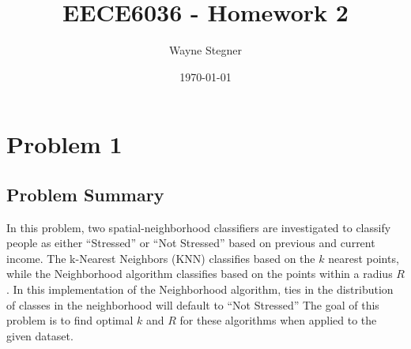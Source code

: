 \documentclass[a4paper, 11pt, titlepage]{article}
\title{EECE6036 - Homework 2}
\author{Wayne Stegner}
\date{\today}
\begin{document}
  \maketitle
  \section{Problem 1}
  \subsection{Problem Summary}
  \par In this problem, two spatial-neighborhood classifiers are investigated
  to classify people as either ``Stressed'' or ``Not Stressed'' based on
  previous and current income.
  The k-Nearest Neighbors (KNN) classifies based on the $k$ nearest points,
  while the Neighborhood algorithm classifies based on the points within a
  radius $R$.
  In this implementation of the Neighborhood algorithm, ties in the
  distribution of classes in the neighborhood will default to ``Not Stressed''
  The goal of this problem is to find optimal $k$ and $R$ for these algorithms
  when applied to the given dataset.
\end{document}
